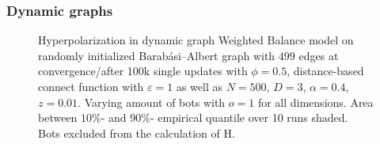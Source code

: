 \documentclass[11pt]{article}
\begin{document}
\subsubsection{Dynamic graphs}
\begin{figure}[h!]
\caption{Hyperpolarization in dynamic graph Weighted Balance model on randomly initialized Barabási–Albert graph with $499$ edges at convergence/after 100k single updates with $\phi=0.5$, distance-based connect function with $\varepsilon=1$ as well as $N=500$, $D=3$, $\alpha=0.4$, $z=0.01$. Varying amount of bots with $o=1$ for all dimensions. Area between $10\%$- and $90\%$- empirical quantile over 10 runs shaded. Bots excluded from the calculation of H.}
\label{bots dynamic}
\end{figure}
\end{document}
